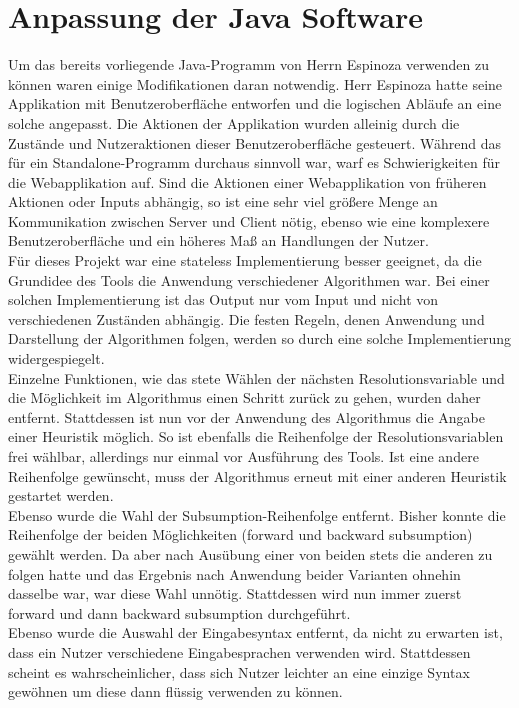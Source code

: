 \section{Anpassung der Java Software}
Um das bereits vorliegende Java-Programm von Herrn Espinoza verwenden zu können waren einige Modifikationen daran notwendig. Herr Espinoza hatte seine Applikation mit Benutzeroberfläche entworfen und die logischen Abläufe an eine solche angepasst. Die Aktionen der Applikation wurden alleinig durch die Zustände und Nutzeraktionen dieser Benutzeroberfläche gesteuert. Während das für ein Standalone-Programm durchaus sinnvoll war, warf es Schwierigkeiten für die Webapplikation auf. Sind die Aktionen einer Webapplikation von früheren Aktionen oder Inputs abhängig, so ist  eine sehr viel größere Menge an Kommunikation zwischen Server und Client nötig, ebenso wie eine komplexere Benutzeroberfläche und ein höheres Maß an Handlungen der Nutzer. \\
Für dieses Projekt war eine stateless Implementierung besser geeignet, da die Grundidee des Tools die Anwendung verschiedener Algorithmen war. Bei einer solchen Implementierung ist das Output nur vom Input und nicht von verschiedenen Zuständen abhängig. Die festen Regeln, denen Anwendung und Darstellung der Algorithmen folgen, werden so durch eine solche Implementierung widergespiegelt.\\
Einzelne Funktionen, wie das stete Wählen der nächsten Resolutionsvariable und die Möglichkeit im Algorithmus einen Schritt zurück zu gehen, wurden daher entfernt. Stattdessen ist nun vor der Anwendung des Algorithmus die Angabe einer Heuristik möglich. So ist ebenfalls die Reihenfolge der Resolutionsvariablen frei wählbar, allerdings nur einmal vor Ausführung des Tools. Ist eine andere Reihenfolge gewünscht, muss der Algorithmus erneut mit einer anderen Heuristik gestartet werden. \\
Ebenso wurde die Wahl der Subsumption-Reihenfolge entfernt. Bisher konnte die Reihenfolge der beiden Möglichkeiten (forward und backward subsumption) gewählt werden. Da aber nach Ausübung einer von beiden stets die anderen zu folgen hatte und das Ergebnis nach Anwendung beider Varianten ohnehin dasselbe war, war diese Wahl unnötig. Stattdessen wird nun immer zuerst forward und dann backward subsumption durchgeführt. \\
Ebenso wurde die Auswahl der Eingabesyntax entfernt, da nicht zu erwarten ist, dass ein Nutzer verschiedene Eingabesprachen verwenden wird. Stattdessen scheint es wahrscheinlicher, dass sich Nutzer leichter an eine einzige Syntax gewöhnen um diese dann flüssig verwenden zu können.\\
